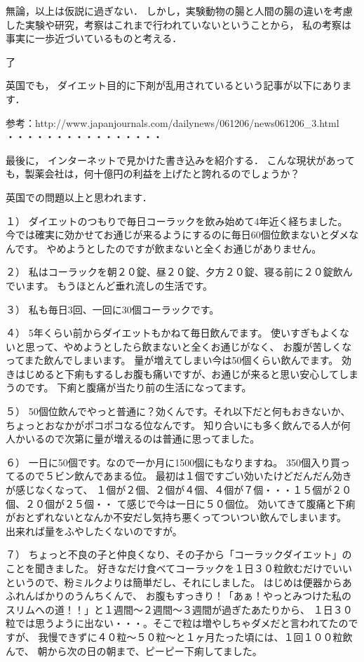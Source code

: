 無論，以上は仮説に過ぎない．
しかし，実験動物の腸と人間の腸の違いを考慮した実験や研究，考察はこれまで行われていないということから，
私の考察は事実に一歩近づいているものと考える．

了


英国でも，
ダイエット目的に下剤が乱用されているという記事が以下にあります．

参考：http://www.japanjournals.com/dailynews/061206/news061206_3.html
・・・・・・・・・・・・・・・・



最後に，
インターネットで見かけた書き込みを紹介する．
こんな現状があっても，製薬会社は，何十億円の利益を上げたと誇れるのでしょうか？ 

英国での問題以上と思われます．


１） ダイエットのつもりで毎日コーラックを飲み始めて4年近く経ちました。
今では確実に効かせてお通じが来るようにするのに毎日60個位飲まないとダメなんです。
やめようとしたのですが飲まないと全くお通じがありません。

２） 私はコーラックを朝２０錠、昼２０錠、夕方２０錠、寝る前に２０錠飲んでいます。
もうほとんど垂れ流しの生活です。

３） 私も毎日3回、一回に30個コーラックです。

４） 5年くらい前からダイエットもかねて毎日飲んでます。
使いすぎもよくないと思って、やめようとしたら飲まないと全くお通じがなく、
 お腹が苦しくなってまた飲んでしまいます。
量が増えてしまい今は50個くらい飲んでます。
効きはじめると下痢もするしお腹も痛いですが、お通じが来ると思い安心してしまうのです。
下痢と腹痛が当たり前の生活になってます。

５） 50個位飲んでやっと普通に？効くんです。それ以下だと何もおきないか、
ちょっとおなかがポコポコなる位なんです。
知り合いにも多く飲んでる人が何人かいるので次第に量が増えるのは普通に思ってました。

６） 一日に50個です。なので一か月に1500個にもなりますね。
350個入り買ってるので５ビン飲んであまる位。
最初は１個ですごい効いたけどだんだん効きが感じなくなって、 
１個が２個、２個が４個、４個が７個・・・１５個が２０個、２０個が２５個・・ て感じで今は一日に５０個位。
効いてきて腹痛と下痢がおとずれないとなんか不安だし気持ち悪くってついつい飲んでしまいます。
出来れば量をふやしたくないのですが。

７） ちょっと不良の子と仲良くなり、その子から「コーラックダイエット」のことを聞きました。
好きなだけ食べてコーラックを１日３０粒飲むだけでいいというので、粉ミルクよりは簡単だし、それにしました。
はじめは便器からあふれんばかりのうんちくんで、
お腹もすっきり！「あぁ！やっとみつけた私のスリムへの道！！」と１週間～２週間～３週間が過ぎたあたりから、
１日３０粒では思うように出ない・・・。そこで粒は増やしちゃダメだと言われてたのですが、
我慢できずに４０粒～５０粒～と１ヶ月たった頃には、１回１００粒飲んで、
朝から次の日の朝まで、ピーピー下痢してました。

